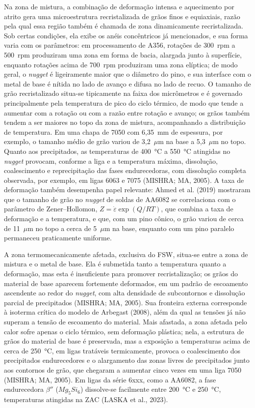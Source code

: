 \documentclass[12pt,openany]{report}
\begin{document}
Na zona de mistura, a combinação de deformação intensa e aquecimento por atrito gera uma microestrutura recristalizada de grãos finos e equiaxiais, razão pela qual essa região também é chamada de zona dinamicamente recristalizada. Sob certas condições, ela exibe os anéis concêntricos já mencionados, e sua forma varia com os parâmetros: em processamento de A356, rotações de 300~rpm a 500~rpm produziram uma zona em forma de bacia, alargada junto à superfície, enquanto rotações acima de 700~rpm produziram uma zona elíptica; de modo geral, o \textit{nugget} é ligeiramente maior que o diâmetro do pino, e sua interface com o metal de base é nítida no lado de avanço e difusa no lado de recuo. O tamanho de grão recristalizado situa-se tipicamente na faixa dos micrômetros e é governado principalmente pela temperatura de pico do ciclo térmico, de modo que tende a aumentar com a rotação ou com a razão entre rotação e avanço; os grãos também tendem a ser maiores no topo da zona de mistura, acompanhando a distribuição de temperatura. Em uma chapa de 7050 com 6,35~mm de espessura, por exemplo, o tamanho médio de grão variou de 3,2~$\mu$m na base a 5,3~$\mu$m no topo. Quanto aos precipitados, as temperaturas de 400~°C a 550~°C atingidas no \textit{nugget} provocam, conforme a liga e a temperatura máxima, dissolução, coalescimento e reprecipitação das fases endurecedoras, com dissolução completa observada, por exemplo, em ligas 6063 e 7075 (MISHRA; MA, 2005). A taxa de deformação também desempenha papel relevante: Ahmed et al. (2019) mostraram que o tamanho de grão no \textit{nugget} de soldas de AA6082 se correlaciona com o parâmetro de Zener--Hollomon, $Z = \dot{\varepsilon}\exp\left(Q/RT\right)$, que combina a taxa de deformação e a temperatura, e que, com um pino cônico, o grão variou de cerca de 11~$\mu$m no topo a cerca de 5~$\mu$m na base, enquanto com um pino paralelo permaneceu praticamente uniforme.

A zona termomecanicamente afetada, exclusiva do FSW, situa-se entre a zona de mistura e o metal de base. Ela é submetida tanto a temperatura quanto a deformação, mas esta é insuficiente para promover recristalização; os grãos do material de base aparecem fortemente deformados, em um padrão de escoamento ascendente ao redor do \textit{nugget}, com alta densidade de subcontornos e dissolução parcial de precipitados (MISHRA; MA, 2005). Sua fronteira externa corresponde à isoterma crítica do modelo de Arbegast (2008), além da qual as tensões já não superam a tensão de escoamento do material. Mais afastada, a zona afetada pelo calor sofre apenas o ciclo térmico, sem deformação plástica; nela, a estrutura de grãos do material de base é preservada, mas a exposição a temperaturas acima de cerca de 250~°C, em ligas tratáveis termicamente, provoca o coalescimento dos precipitados endurecedores e o alargamento das zonas livres de precipitados junto aos contornos de grão, que chegaram a aumentar cinco vezes em uma liga 7050 (MISHRA; MA, 2005). Em ligas da série 6xxx, como a AA6082, a fase endurecedora $\beta''$ ($Mg_5Si_6$) dissolve-se facilmente entre 200~°C e 250~°C, temperaturas atingidas na ZAC (LASKA et al., 2023).
\end{document}
